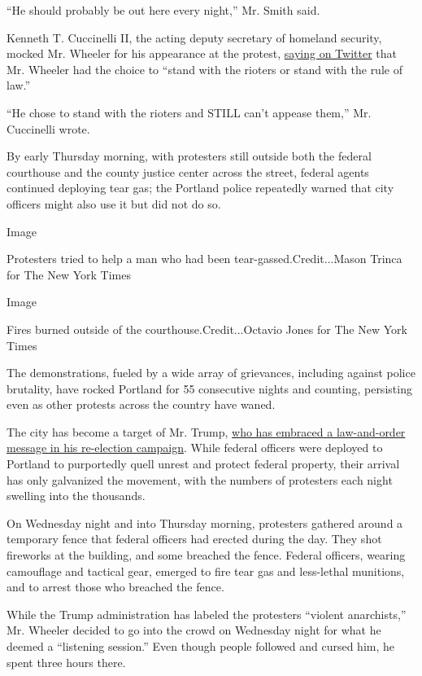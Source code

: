 ``He should probably be out here every night,'' Mr. Smith said.

Kenneth T. Cuccinelli II, the acting deputy secretary of homeland
security, mocked Mr. Wheeler for his appearance at the protest,
\href{https://twitter.com/HomelandKen/status/1286361863433879552?s=20}{saying
on Twitter} that Mr. Wheeler had the choice to ``stand with the rioters
or stand with the rule of law.''

``He chose to stand with the rioters and STILL can't appease them,'' Mr.
Cuccinelli wrote.

By early Thursday morning, with protesters still outside both the
federal courthouse and the county justice center across the street,
federal agents continued deploying tear gas; the Portland police
repeatedly warned that city officers might also use it but did not do
so.

Image

Protesters tried to help a man who had been tear-gassed.Credit...Mason
Trinca for The New York Times

Image

Fires burned outside of the courthouse.Credit...Octavio Jones for The
New York Times

The demonstrations, fueled by a wide array of grievances, including
against police brutality, have rocked Portland for 55 consecutive nights
and counting, persisting even as other protests across the country have
waned.

The city has become a target of Mr. Trump,
\href{https://www.nytimes.com/2020/07/21/us/politics/trump-portland-federal-agents.html}{who
has embraced a law-and-order message in his re-election campaign}. While
federal officers were deployed to Portland to purportedly quell unrest
and protect federal property, their arrival has only galvanized the
movement, with the numbers of protesters each night swelling into the
thousands.

On Wednesday night and into Thursday morning, protesters gathered around
a temporary fence that federal officers had erected during the day. They
shot fireworks at the building, and some breached the fence. Federal
officers, wearing camouflage and tactical gear, emerged to fire tear gas
and less-lethal munitions, and to arrest those who breached the fence.

While the Trump administration has labeled the protesters ``violent
anarchists,'' Mr. Wheeler decided to go into the crowd on Wednesday
night for what he deemed a ``listening session.'' Even though people
followed and cursed him, he spent three hours there.

